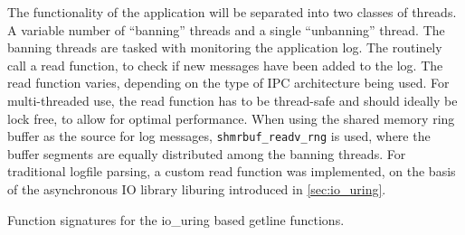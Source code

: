 The functionality of the application will be separated into two classes of threads. A variable number of ``banning'' threads
and a single ``unbanning'' thread. The banning threads are tasked with monitoring the application log. The routinely call a read
function, to check if new messages have been added to the log. The read function varies, depending on the type of \ac{IPC} architecture
being used. For multi-threaded use, the read function has to be thread-safe and should ideally be lock free, to allow for optimal performance.
When using the shared memory ring buffer as the source for log messages, \texttt{shmrbuf\_readv\_rng} is used, where the buffer segments
are equally distributed among the banning threads. For traditional logfile parsing, a custom read function was implemented, on the
basis of the asynchronous \ac{IO} library liburing introduced in \ref{sec:io_uring}.

\begin{algorithm}[h!]
    
    \label{alg:uring_getline}
    \caption[Asynchronous Getline Function]{Function signatures for the io\_uring based getline functions.}
\end{algorithm}

